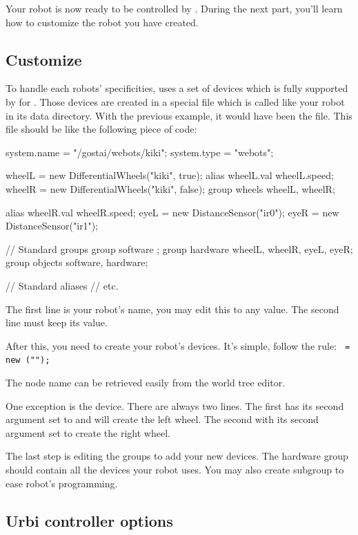 Your robot is now ready to be controlled by \urbi. During the next
part, you'll learn how to customize the robot you have created.


\subsection{Customize}

To handle each robots' specificities, \webots uses a set of devices
which is fully supported by \urbi for \webots. Those devices are
created in a special file which is called like your robot in its data
directory.  With the previous example, it would have been the
 file. This file should be like the following
piece of code:

\begin{urbiunchecked}
system.name = "/gostai/webots/kiki";
system.type = "webots";


wheelL = new DifferentialWheels("kiki", true);
alias wheelL.val wheelL.speed;
wheelR = new DifferentialWheels("kiki", false);
group wheels {wheelL, wheelR};

alias wheelR.val wheelR.speed;
eyeL = new DistanceSensor("ir0");
eyeR = new DistanceSensor("ir1");

// Standard groups
group software {};
group hardware {wheelL, wheelR, eyeL, eyeR};
group objects {software, hardware};

// Standard aliases
// etc.
\end{urbiunchecked}

The first line is your robot's name, you may edit this to any value.
The second line must keep its value.

After this, you need to create your robot's devices. It's simple,
follow the rule: \texttt{ = new
  (""); }

The node name can be retrieved easily from the \webots world tree
editor.

One exception is the  device.  There are
always two lines. The first has its second argument set to 
and will create the left wheel. The second with its second argument
set to  create the right wheel.

The last step is editing the groups to add your new devices. The
hardware group should contain all the devices your robot uses. You may
also create subgroup to ease robot's programming.


\subsection{Urbi controller options}


